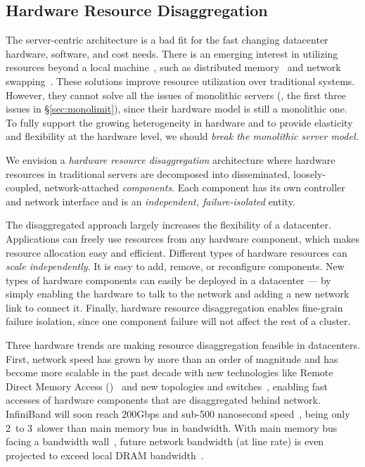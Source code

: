 \documentclass[10pt,times,twocolumn]{z2-article}
\begin{document}
\subsection{Hardware Resource Disaggregation}
The server-centric architecture is a bad fit for the fast changing datacenter hardware, software, and cost needs.
There is an emerging interest in utilizing resources beyond a local machine~\cite{Gao16-OSDI},
such as distributed memory~\cite{Dragojevic14-FaRM,Nelson15-ATC,Aguilera17-SOCC,Novakovic16-SOCC} and network swapping~\cite{GU17-NSDI}. 
These solutions improve resource utilization over traditional systems.
However, they cannot solve all the issues of monolithic servers (\eg, the first three issues in \S\ref{sec:monolimit}), 
since their hardware model is still a monolithic one.
To fully support the growing heterogeneity in hardware and to provide elasticity and flexibility at the hardware level, 
we should {\em break the monolithic server model.}%

We envision a {\em hardware resource disaggregation} architecture 
where hardware resources in traditional servers are decomposed into disseminated, loosely-coupled, network-attached {\em components}.
Each component has its own controller and network interface
and is an {\em independent, failure-isolated} entity.

The disaggregated approach largely increases the flexibility of a datacenter.
Applications can freely use resources from any hardware component,
which makes resource allocation easy and efficient.
Different types of hardware resources can {\em scale independently}.
It is easy to add, remove, or reconfigure components.
New types of hardware components can easily be deployed in a datacenter ---
by simply enabling the hardware to talk to the network and adding a new network link to connect it.
Finally, hardware resource disaggregation enables fine-grain failure isolation, %
since one component failure will not affect the rest of a cluster.

Three hardware trends are making resource disaggregation feasible in datacenters.
First, network speed has grown by more than an order of magnitude and has become more scalable in the past decade %
with new technologies like Remote Direct Memory Access ({\em \rdma})~\cite{ibverbs} 
and new topologies and switches~\cite{FireBox-FASTKeynote,costa15-r2c2,Costa-WRSC14},
enabling fast accesses of hardware components that are disaggregated behind network.
InfiniBand will soon reach 200Gbps and sub-500 nanosecond speed~\cite{Mellanox-ConnectX6,Mellanox-ConnectX6-IB,Mellanox-Switch},
being only 2\x\ to 3\x\ slower than main memory bus in bandwidth.
With main memory bus facing a bandwidth wall~\cite{BW-Wall-ISCA09},
future network bandwidth (at line rate) is even projected to exceed local DRAM bandwidth~\cite{CacheCloud-hotcloud18}.
\end{document}
